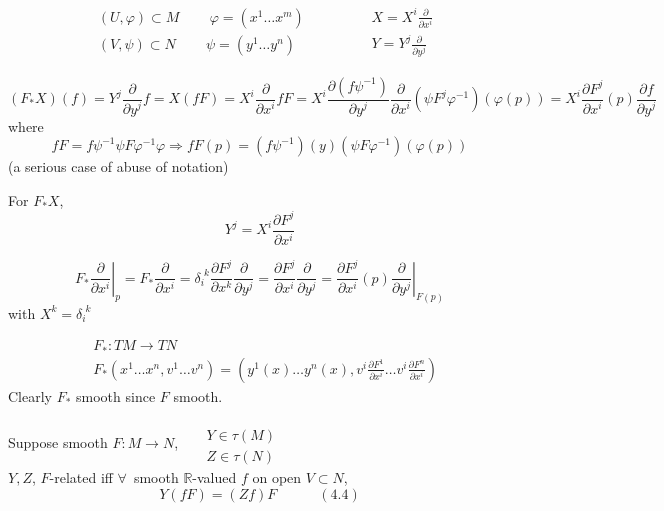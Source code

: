 \[
\begin{gathered}
  \begin{aligned}
    & (U , \varphi) \subset M \quad \quad \, \varphi = (x^1 \dots x^m) \\ 
    & (V, \psi ) \subset N \quad \quad \, \psi = (y^1 \dots y^n) 
\end{aligned}  \quad \quad \quad \, \begin{aligned} & X = X^i \frac{ \partial }{ \partial x^i } \\ 
    & Y = Y^j \frac{ \partial }{ \partial y^j } \end{aligned}
\end{gathered}
\]

\[
(F_* X)(f) = Y^j \frac{ \partial }{ \partial y^j} f = X(fF) = X^i \frac{ \partial }{ \partial x^i } fF = X^i \frac{ \partial (f\psi^{-1})}{ \partial y^j} \frac{ \partial }{ \partial x^i } (\psi F^j \varphi^{-1})(\varphi(p)) = X^i \frac{ \partial F^j}{ \partial x^i }(p) \frac{ \partial f}{ \partial y^j}
\]
where
\[
fF = f\psi^{-1} \psi F\varphi^{-1} \varphi \Longrightarrow fF(p) = (f\psi^{-1})(y) (\psi F\varphi^{-1})(\varphi(p))
\]
(a serious case of abuse of notation)

For $F_*X$, 
\[
Y^j = X^i \frac{ \partial F^j}{ \partial x^i}
\]

\[
F_* \left. \frac{ \partial }{ \partial x^i } \right|_p = F_* \frac{ \partial }{ \partial x^i} = \delta_i^{ \, \, k } \frac{ \partial F^j}{ \partial x^k} \frac{ \partial }{ \partial y^j} = \frac{ \partial F^j}{ \partial x^i } \frac{ \partial }{ \partial y^j} = \frac{ \partial F^j}{ \partial x^i}(p) \left. \frac{ \partial }{ \partial y^j } \right|_{F(p)}
\]
with $X^k = \delta_i^{\, \, k}$

\[
\begin{aligned}
  &  F_* : TM \to TN \\
  & F_*( x^1 \dots x^n, v^1 \dots v^n) = (y^1(x) \dots y^n(x), v^i \frac{ \partial F^1}{ \partial x^i} \dots v^i \frac{ \partial F^n}{ \partial x^i} )
\end{aligned}
\]
Clearly $F_*$ smooth since $F$ smooth.  

\begin{lemma}[4.8] Suppose smooth $F: M \to N$, \, $\begin{aligned} & \quad \\ & Y \in \tau(M) \\ & Z \in \tau(N) \end{aligned}$ \\
$Y,Z$, $F$-related iff $\forall \, $ smooth $\mathbb{R}$-valued $f$ on open $V \subset N$, 
\[
Y(fF) = (Zf) F \quad \quad \quad (4.4) 
\]
\end{lemma}

